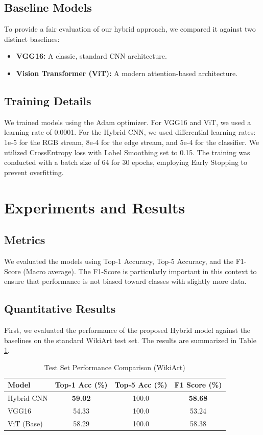 \documentclass[conference]{IEEEtran}
\begin{document}
\subsection{Baseline Models}
To provide a fair evaluation of our hybrid approach, we compared it against two distinct baselines:
\begin{itemize}
    \item \textbf{VGG16:} A classic, standard CNN architecture.
    \item \textbf{Vision Transformer (ViT):} A modern attention-based architecture.
\end{itemize}

\subsection{Training Details}
We trained models using the Adam optimizer. For VGG16 and ViT, we used a learning rate of 0.0001. For the Hybrid CNN, we used differential learning rates: 1e-5 for the RGB stream, 8e-4 for the edge stream, and 5e-4 for the classifier. We utilized CrossEntropy loss with Label Smoothing set to 0.15. The training was conducted with a batch size of 64 for 30 epochs, employing Early Stopping to prevent overfitting.

\section{Experiments and Results}

\subsection{Metrics}
We evaluated the models using Top-1 Accuracy, Top-5 Accuracy, and the F1-Score (Macro average). The F1-Score is particularly important in this context to ensure that performance is not biased toward classes with slightly more data.

\subsection{Quantitative Results}
First, we evaluated the performance of the proposed Hybrid model against the baselines on the standard WikiArt test set. The results are summarized in Table \ref{tab:test_performance}.

\begin{table}[H]
\centering
\caption{Test Set Performance Comparison (WikiArt)}
\label{tab:test_performance}
\begin{tabular}{@{}lccc@{}}
\toprule
Model & Top-1 Acc (\%) & Top-5 Acc (\%) & F1 Score (\%) \\ \midrule
Hybrid CNN & \textbf{59.02} & 100.0 & \textbf{58.68} \\
VGG16 & 54.33 & 100.0 & 53.24 \\
ViT (Base) & 58.29 & 100.0 & 58.38 \\ \bottomrule
\end{tabular}
\end{table}
\end{document}
